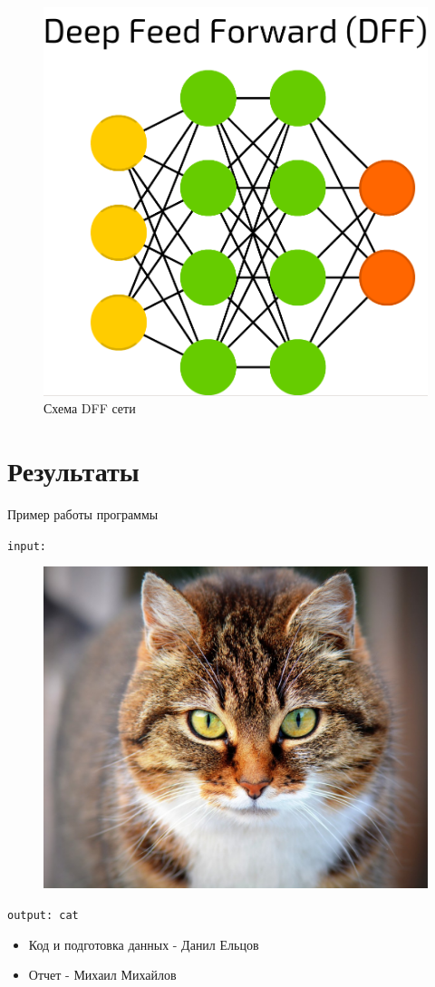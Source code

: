 \documentclass{article}
\begin{document}
\begin{figure}[h!]
    \centering
    \includegraphics[scale=0.1]{model.png}
    \caption{Схема DFF сети}
    \label{fig:model}
\end{figure}

\section{Результаты}

Пример работы программы

\texttt{input:}
\begin{figure}[h!]
    \centering
    \includegraphics[scale=0.1]{input.png}
\end{figure}

\texttt{output: cat}


\begin{itemize}
    \item Код и подготовка данных - Данил Ельцов
    \item Отчет - Михаил Михайлов
\end{itemize}
\end{document}
